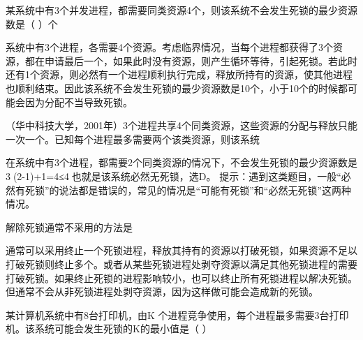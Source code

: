 \question 某系统中有3个并发进程，都需要同类资源4个，则该系统不会发生死锁的最少资源数是（
）个
\par{}
\begin{solution}系统中有3个进程，各需要4个资源。考虑临界情况，当每个进程都获得了3个资源，都在申请最后一个，如果此时没有资源，则产生循环等待，引起死锁。若此时还有1个资源，则必然有一个进程顺利执行完成，释放所持有的资源，使其他进程也顺利结束。因此该系统不会发生死锁的最少资源数是10个，小于10个的时候都可能会因为分配不当导致死锁。
\end{solution}
\question （华中科技大学，2001年）3个进程共享4个同类资源，这些资源的分配与释放只能一次一个。已知每个进程最多需要两个该类资源，则该系统
\par{}
\begin{solution}在系统中有3个进程，都需要2个同类资源的情况下，不会发生死锁的最少资源数是3(2-1)+1=4≤4，也就是该系统必然无死锁，选D。
提示：遇到这类题目，一般``必然有死锁''的说法都是错误的，常见的情况是``可能有死锁''和``必然无死锁''这两种情况。
\end{solution}
\question 解除死锁通常不采用的方法是
\par{}
\begin{solution}通常可以采用终止一个死锁进程，释放其持有的资源以打破死锁，如果资源不足以打破死锁则终止多个。或者从某些死锁进程处剥夺资源以满足其他死锁进程的需要打破死锁。如果终止死锁的进程影响较小，也可以终止所有死锁进程以解决死锁。但通常不会从非死锁进程处剥夺资源，因为这样做可能会造成新的死锁。
\end{solution}
\question 某计算机系统中有8台打印机，由K
个进程竞争使用，每个进程最多需要3台打印机。该系统可能会发生死锁的K的最小值是（
）
\par{}
